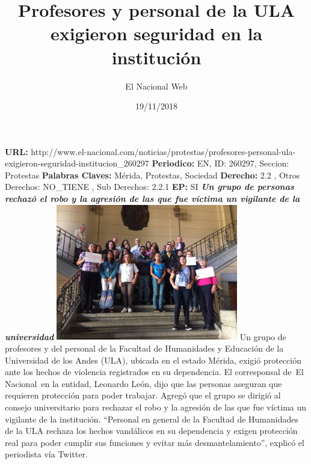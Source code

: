 \documentclass{article}%
\title{\textbf{Profesores y personal de la ULA exigieron seguridad en la institución}}%
\author{El Nacional Web}%
\date{19/11/2018}%
\begin{document}
%
\normalsize%
\maketitle%
\textbf{URL: }%
http://www.el{-}nacional.com/noticias/protestas/profesores{-}personal{-}ula{-}exigieron{-}seguridad{-}institucion\_260297\newline%
%
\textbf{Periodico: }%
EN, %
ID: %
260297, %
Seccion: %
Protestas\newline%
%
\textbf{Palabras Claves: }%
Mérida, Protestas, Sociedad\newline%
%
\textbf{Derecho: }%
2.2%
, Otros Derechos: %
NO\_TIENE%
, Sub Derechos: %
2.2.1%
\newline%
%
\textbf{EP: }%
SI\newline%
\newline%
%
\textbf{\textit{Un grupo de personas rechazó el robo y la agresión de las que fue víctima un vigilante de la universidad}}%
\newline%
\newline%
%
\includegraphics[width=300px]{48.jpg}%
\newline%
%
Un grupo de profesores y del personal de la Facultad de Humanidades y Educación de la Universidad de los Andes (ULA), ubicada en el estado Mérida, exigió protección ante los hechos de violencia registrados en su dependencia.%
\newline%
%
El corresponsal de~El Nacional~en la entidad, Leonardo León, dijo que las personas aseguran que requieren protección para poder trabajar.%
\newline%
%
Agregó que el grupo se dirigió al consejo universitario para rechazar el robo y la agresión de las que fue víctima un vigilante de la institución.%
\newline%
%
“Personal en general de la Facultad de Humanidades de la ULA rechaza los hechos vandálicos en su dependencia y exigen protección real para poder cumplir sus funciones y evitar más desmantelamiento”, explicó el periodista vía Twitter.%
\newline%
%
\end{document}
